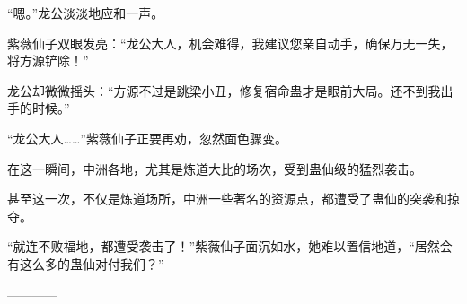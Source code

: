 \begin{this_body}
“嗯。”龙公淡淡地应和一声。

紫薇仙子双眼发亮：“龙公大人，机会难得，我建议您亲自动手，确保万无一失，将方源铲除！”

龙公却微微摇头：“方源不过是跳梁小丑，修复宿命蛊才是眼前大局。还不到我出手的时候。”

“龙公大人……”紫薇仙子正要再劝，忽然面色骤变。

在这一瞬间，中洲各地，尤其是炼道大比的场次，受到蛊仙级的猛烈袭击。

甚至这一次，不仅是炼道场所，中洲一些著名的资源点，都遭受了蛊仙的突袭和掠夺。

“就连不败福地，都遭受袭击了！”紫薇仙子面沉如水，她难以置信地道，“居然会有这么多的蛊仙对付我们？”

------------

\end{this_body}

